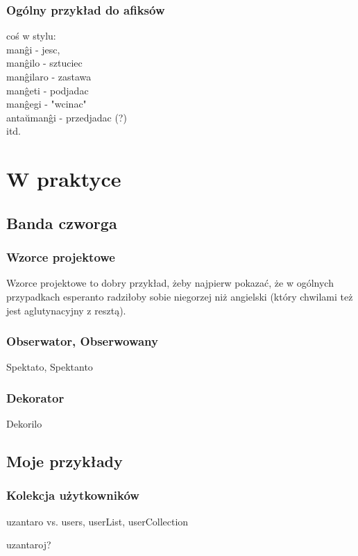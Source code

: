 \documentclass{beamer}
\begin{document}
  \begin{frame}
  	\frametitle{Ogólny przykład do afiksów}
  	
  	coś w stylu:\\
  	manĝi - jesc,\\
  	manĝilo - sztuciec\\
  	manĝilaro - zastawa\\
  	manĝeti - podjadac\\
  	manĝegi - "wcinac"\\
  	antaŭmanĝi - przedjadac (?)\\
  	itd.

  \end{frame}
 
  \section{W praktyce}
  \subsection{Banda czworga}
  
  \begin{frame}
  \frametitle{Wzorce projektowe}
  Wzorce projektowe to dobry przykład, żeby najpierw pokazać, że w ogólnych przypadkach esperanto radziłoby sobie niegorzej niż angielski (który chwilami też jest aglutynacyjny z resztą).
  \end{frame}  

  \begin{frame}
  \frametitle{Obserwator, Obserwowany}
  Spektato, Spektanto
  \end{frame}  
  
  \begin{frame}
  \frametitle{Dekorator}
  Dekorilo
  \end{frame}  
 
  
    
  \subsection{Moje przykłady}
  
  \begin{frame}
  \tableofcontents[currentsubsection]
  \end{frame}  
 
  \begin{frame}
  	\frametitle{Kolekcja użytkowników}

	uzantaro vs. users, userList, userCollection
	
	uzantaroj?
  \end{frame}
  
\end{document}

